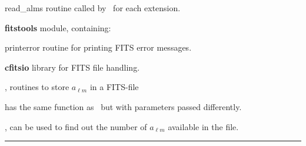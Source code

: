 \begin{modules}
  \begin{sulist}{} %
  \item[read\_alms] routine called by \thedocid\ for each extension.
  \item[\textbf{fitstools}] module, containing:
  \item[printerror] routine for printing FITS error messages.
  \item[\textbf{cfitsio}] library for FITS file handling.		
  \end{sulist}
\end{modules}
\newpage
\begin{related}
  \begin{sulist}{} %
  \item[\htmlref{alms2fits}{sub:alms2fits}, \htmlref{dump\_alms}{sub:dump_alms}] routines to store $a_{\ell m}$ in a FITS-file 
  \item[\htmlref{read\_conbintab}{sub:read_conbintab}] has the same function as
  \thedocid\ but with parameters passed differently.
  \item[\htmlref{number\_of\_alms}{sub:number_of_alms}, \htmlref{getsize\_fits}{sub:getsize_fits}]
  can be used to find out the number of $a_{\ell m}$ available in the file.
  \end{sulist}
\end{related}

\rule{\hsize}{2mm}

\newpage
